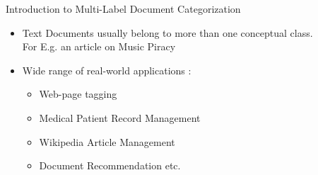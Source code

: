 \documentclass[10pt]{beamer}
\begin{document}

\begin{frame}{Introduction to Multi-Label Document Categorization}
\vfill{}
\vfill
{}
\begin{itemize}
	\vfill\item<1-> Text Documents usually belong to more than one conceptual class. \\For E.g. an article on Music Piracy 
	\vfill\item<1-> Wide range of real-world applications :
	\begin{itemize} 
	  \vfill\item<1-> Web-page tagging
	  \vfill\item<1-> Medical Patient Record Management
	  \vfill\item<1-> Wikipedia Article Management
	  \vfill\item<1-> Document Recommendation etc.
	\end{itemize} 
\end{itemize}
\vfill
\end{frame}

\end{document}
